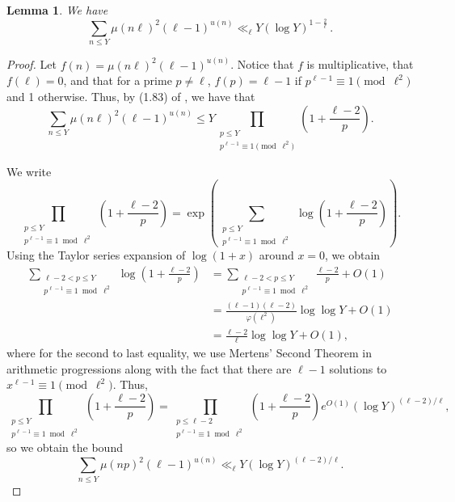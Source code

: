 \documentclass[12pt]{amsart}
\newtheorem{lemma}{Lemma}
\begin{document}
\begin{lemma}\label{L:sum2}
We have
$$
\sum_{n \leq Y}
\mu(n\ell)^2(\ell-1)^{u(n)}
\ll_\ell
Y(\log Y)^{1-\frac{2}{\ell}}
\,.
$$
\end{lemma}

\begin{proof}
Let $f(n) = \mu(n\ell)^2(\ell-1)^{u(n)}$. Notice that $f$ is multiplicative, that $f(\ell) = 0$, and that for a prime $p \neq \ell$, $f(p) = \ell-1$ if $p^{\ell-1} \equiv 1 \pmod{\ell^2}$ and 1 otherwise. Thus, by (1.83) of \cite{IK}, we have that 
    \[ \sum_{n \leq Y} \mu(n\ell)^2(\ell-1)^{u(n)} \leq Y \prod_{\substack{p \leq Y\\ p^{\ell-1} \equiv 1 \pmod{\ell^2}}} \left( 1 + \frac{\ell-2}{p} \right).\] 
    
    We write 
    \[ \prod_{\substack{p \leq Y\\ p^{\ell-1} \equiv 1 \bmod{\ell^2}}} \left( 1 + \frac{\ell-2}{p} \right) = \exp\left({\sum_{\substack{p \leq Y\\ p^{\ell-1} \equiv 1 \bmod{\ell^2}}} \log\left( 1 + \frac{\ell-2}{p}\right)}\right).\] Using the Taylor series expansion of $\log(1+x)$ around $x=0$, we obtain 
    \begin{align*}
        \sum_{\substack{\ell-2 < p \leq Y\\ p^{\ell-1} \equiv 1 \bmod{\ell^2}}} \log\left( 1 + \frac{\ell-2}{p}\right) &= \sum_{\substack{\ell-2 < p \leq Y\\ p^{\ell-1} \equiv 1 \bmod{\ell^2}}} \frac{\ell-2}{p} + O( 1 ) \\[1ex] &= \frac{(\ell-1)(\ell-2)}{\varphi(\ell^2)}\log\log Y + O(1) \\[1ex]
        &=\frac{\ell-2}{\ell}\log\log Y + O(1),
    \end{align*} 
    where for the second to last equality, we use Mertens' Second Theorem in arithmetic progressions along with the fact that there are $\ell-1$ solutions to $x^{\ell-1} \equiv 1 \pmod{\ell^2}$. Thus, 
    \[ \prod_{\substack{p \leq Y\\ p^{\ell-1} \equiv 1 \bmod{\ell^2}}} \left( 1 + \frac{\ell-2}{p} \right) = \prod_{\substack{p \leq \ell-2\\ p^{\ell-1} \equiv 1 \bmod{\ell^2}}} \left( 1 + \frac{\ell-2}{p} \right) e^{O(1)} (\log Y)^{(\ell-2)/\ell}, \] so we obtain the bound
    \[ \sum_{n \leq Y} \mu(np)^2(\ell-1)^{u(n)} \ll_\ell Y (\log Y)^{(\ell-2)/\ell}.\]
\end{proof}

\end{document}
